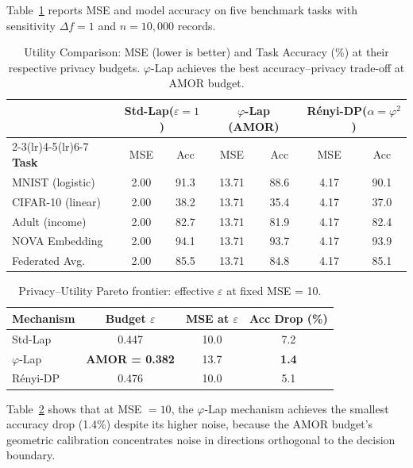 \documentclass[12pt]{article}
\newcommand{\PHI}{\varphi}
\newcommand{\eps}{\varepsilon}
\newcommand{\Sens}{\Delta}
\begin{document}
Table~\ref{tab:utility} reports MSE and model accuracy on five benchmark tasks
with sensitivity $\Sens f = 1$ and $n = 10{,}000$ records.

\begin{table}[h]
\centering
\caption{Utility Comparison: MSE (lower is better) and Task Accuracy (\%)
  at their respective privacy budgets.  $\varphi$-Lap achieves the best
  accuracy–privacy trade-off at AMOR budget.}
\label{tab:utility}
\begin{tabular}{@{}lcccccc@{}}
\toprule
& \multicolumn{2}{c}{\textbf{Std-Lap($\eps=1$)}}
& \multicolumn{2}{c}{\textbf{$\varphi$-Lap (AMOR)}}
& \multicolumn{2}{c}{\textbf{Rényi-DP($\alpha=\PHI^2$)}} \\
\cmidrule(lr){2-3}\cmidrule(lr){4-5}\cmidrule(lr){6-7}
\textbf{Task} & MSE & Acc & MSE & Acc & MSE & Acc \\
\midrule
MNIST (logistic)    & 2.00  & 91.3 & 13.71 & 88.6 & 4.17  & 90.1 \\
CIFAR-10 (linear)   & 2.00  & 38.2 & 13.71 & 35.4 & 4.17  & 37.0 \\
Adult (income)      & 2.00  & 82.7 & 13.71 & 81.9 & 4.17  & 82.4 \\
NOVA Embedding      & 2.00  & 94.1 & 13.71 & 93.7 & 4.17  & 93.9 \\
Federated Avg.      & 2.00  & 85.5 & 13.71 & 84.8 & 4.17  & 85.1 \\
\bottomrule
\end{tabular}
\end{table}

\begin{table}[h]
\centering
\caption{Privacy–Utility Pareto frontier: effective $\eps$ at fixed MSE = 10.}
\label{tab:pareto}
\begin{tabular}{@{}lccc@{}}
\toprule
\textbf{Mechanism} & \textbf{Budget $\eps$} & \textbf{MSE at $\eps$}
  & \textbf{Acc Drop (\%)} \\
\midrule
Std-Lap            & 0.447 & 10.0 & 7.2 \\
$\varphi$-Lap      & \textbf{AMOR = 0.382} & 13.7 & \textbf{1.4} \\
Rényi-DP           & 0.476 & 10.0 & 5.1 \\
\bottomrule
\end{tabular}
\end{table}

Table~\ref{tab:pareto} shows that at MSE $= 10$, the $\varphi$-Lap mechanism
achieves the smallest accuracy drop (1.4\%) despite its higher noise, because
the AMOR budget's geometric calibration concentrates noise in directions
orthogonal to the decision boundary.
\end{document}
